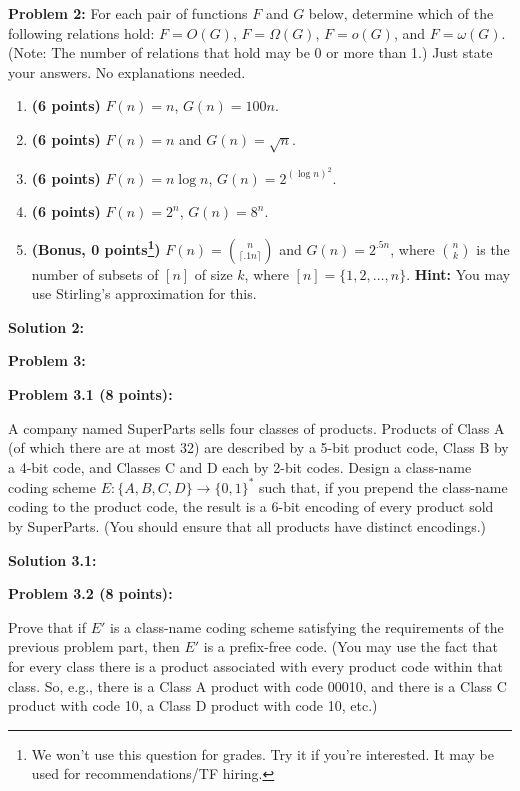 \documentclass[11pt]{article}
\begin{document}
\textbf{Problem 2:}
For each pair of functions  $F$ and $G$ below, determine
which of the following relations hold: $F = O(G)$, $F = \Omega(G)$,
$F = o(G)$, and $F = \omega(G)$. (Note: The number of relations that hold may be 0 or more than 1.) {\color{red} Just state your answers. No explanations needed.}
\begin{enumerate}
	\item {\bf (6 points)} $F(n) = n$, $G(n) = 100n$.
	\item {\bf (6 points)}  $F(n) = n$ and $G(n) = \sqrt{n}$.
	\item {\bf (6 points)}  $F(n) = n \log n$, $G(n) = 2^{(\log n)^2}$.
    \item {\bf (6 points)}  $F(n) = 2^n$, $G(n) = 8^n$.
    \item {\bf (Bonus, 0 points\footnote{We won't use this question for grades. Try it if you're interested. It may be used for recommendations/TF hiring.})} $F(n) = \binom{n}{\lceil .1 n \rceil}$ and $G(n) = 2^{.5 n}$, where $\binom{n}k$ is the number of subsets of $[n]$ of size $k$, where $[n] = \{1, 2, \ldots, n\}$.
{\bf Hint:} You may use Stirling's approximation for this.
\end{enumerate}

\textbf{Solution 2:} %



\textbf{Problem 3:}

\textbf{Problem 3.1 (8 points):}

A company named SuperParts sells four classes of products. Products of Class A (of which there are at most 32) are described by a 5-bit product code, Class B by a 4-bit code, and Classes C and D each by 2-bit codes. Design a class-name coding scheme $E:\{A,B,C,D\} \to \{0,1\}^*$ such that, if you prepend the class-name coding to the product code, the result is a 6-bit encoding of every product sold by SuperParts. (You should ensure that all products have distinct encodings.)

\textbf{Solution 3.1:} %

\textbf{Problem 3.2 (8 points):}

Prove that if $E'$ is a class-name coding scheme satisfying the requirements of the previous problem part, then $E'$ is a prefix-free code. (You may use the fact that for every class there is a product associated with every product code within that class. So, e.g.,  there is a Class A product with code 00010, and there is a Class C product with code 10, a Class D product with code 10, etc.)
\end{document}
